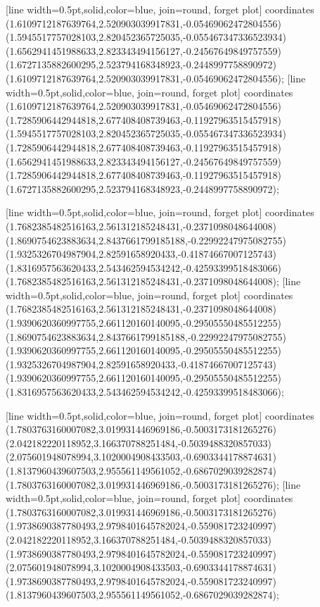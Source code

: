[line width=0.5pt,solid,color=blue, join=round, forget plot] coordinates {(1.6109712187639764,2.520903039917831,-0.05469062472804556) (1.5945517757028103,2.820452365725035,-0.055467347336523934) (1.6562941451988633,2.823343494156127,-0.24567649849757559) (1.6727135882600295,2.523794168348923,-0.2448997758890972) (1.6109712187639764,2.520903039917831,-0.05469062472804556)};
[line width=0.5pt,solid,color=blue, join=round, forget plot] coordinates {(1.6109712187639764,2.520903039917831,-0.05469062472804556) (1.7285906442944818,2.677408408739463,-0.11927963515457918) (1.5945517757028103,2.820452365725035,-0.055467347336523934) (1.7285906442944818,2.677408408739463,-0.11927963515457918) (1.6562941451988633,2.823343494156127,-0.24567649849757559) (1.7285906442944818,2.677408408739463,-0.11927963515457918) (1.6727135882600295,2.523794168348923,-0.2448997758890972)};

[line width=0.5pt,solid,color=blue, join=round, forget plot] coordinates {(1.7682385482516163,2.561312185248431,-0.2371098048644008) (1.8690754623883634,2.8437661799185188,-0.22992247975082755) (1.9325326704987904,2.82591658920433,-0.41874667007125743) (1.8316957563620433,2.543462594534242,-0.42593399518483066) (1.7682385482516163,2.561312185248431,-0.2371098048644008)};
[line width=0.5pt,solid,color=blue, join=round, forget plot] coordinates {(1.7682385482516163,2.561312185248431,-0.2371098048644008) (1.9390620360997755,2.661120160140095,-0.29505550485512255) (1.8690754623883634,2.8437661799185188,-0.22992247975082755) (1.9390620360997755,2.661120160140095,-0.29505550485512255) (1.9325326704987904,2.82591658920433,-0.41874667007125743) (1.9390620360997755,2.661120160140095,-0.29505550485512255) (1.8316957563620433,2.543462594534242,-0.42593399518483066)};

[line width=0.5pt,solid,color=blue, join=round, forget plot] coordinates {(1.7803763160007082,3.019931446969186,-0.5003173181265276) (2.042182220118952,3.166370788251484,-0.5039488320857033) (2.075601948078994,3.1020004908433503,-0.6903344178874631) (1.8137960439607503,2.955561149561052,-0.6867029039282874) (1.7803763160007082,3.019931446969186,-0.5003173181265276)};
[line width=0.5pt,solid,color=blue, join=round, forget plot] coordinates {(1.7803763160007082,3.019931446969186,-0.5003173181265276) (1.9738690387780493,2.9798401645782024,-0.559081723240997) (2.042182220118952,3.166370788251484,-0.5039488320857033) (1.9738690387780493,2.9798401645782024,-0.559081723240997) (2.075601948078994,3.1020004908433503,-0.6903344178874631) (1.9738690387780493,2.9798401645782024,-0.559081723240997) (1.8137960439607503,2.955561149561052,-0.6867029039282874)};

